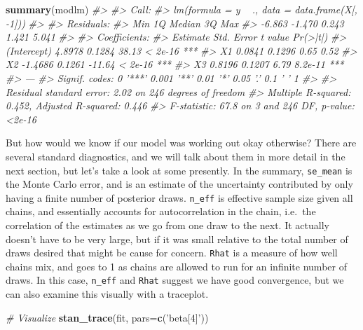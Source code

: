 \documentclass[]{book}
\newenvironment{Shaded}{\begin{snugshade}}{\end{snugshade}}
\newcommand{\CommentTok}[1]{\textcolor[rgb]{0.56,0.35,0.01}{\textit{#1}}}
\newcommand{\DataTypeTok}[1]{\textcolor[rgb]{0.13,0.29,0.53}{#1}}
\newcommand{\KeywordTok}[1]{\textcolor[rgb]{0.13,0.29,0.53}{\textbf{#1}}}
\newcommand{\NormalTok}[1]{#1}
\newcommand{\StringTok}[1]{\textcolor[rgb]{0.31,0.60,0.02}{#1}}
\begin{document}
\begin{Shaded}
\begin{Highlighting}[]
\KeywordTok{summary}\NormalTok{(modlm)}
\CommentTok{#> }
\CommentTok{#> Call:}
\CommentTok{#> lm(formula = y ~ ., data = data.frame(X[, -1]))}
\CommentTok{#> }
\CommentTok{#> Residuals:}
\CommentTok{#>    Min     1Q Median     3Q    Max }
\CommentTok{#> -6.863 -1.470  0.243  1.421  5.041 }
\CommentTok{#> }
\CommentTok{#> Coefficients:}
\CommentTok{#>             Estimate Std. Error t value Pr(>|t|)    }
\CommentTok{#> (Intercept)   4.8978     0.1284   38.13  < 2e-16 ***}
\CommentTok{#> X1            0.0841     0.1296    0.65     0.52    }
\CommentTok{#> X2           -1.4686     0.1261  -11.64  < 2e-16 ***}
\CommentTok{#> X3            0.8196     0.1207    6.79  8.2e-11 ***}
\CommentTok{#> ---}
\CommentTok{#> Signif. codes:  0 '***' 0.001 '**' 0.01 '*' 0.05 '.' 0.1 ' ' 1}
\CommentTok{#> }
\CommentTok{#> Residual standard error: 2.02 on 246 degrees of freedom}
\CommentTok{#> Multiple R-squared:  0.452,  Adjusted R-squared:  0.446 }
\CommentTok{#> F-statistic: 67.8 on 3 and 246 DF,  p-value: <2e-16}
\end{Highlighting}
\end{Shaded}

But how would we know if our model was working out okay otherwise? There are several standard diagnostics, and we will talk about them in more detail in the next section, but let's take a look at some presently. In the summary, \texttt{se\_mean} is the Monte Carlo error, and is an estimate of the uncertainty contributed by only having a finite number of posterior draws. \texttt{n\_eff} is effective sample size given all chains, and essentially accounts for autocorrelation in the chain, i.e.~the correlation of the estimates as we go from one draw to the next. It actually doesn't have to be very large, but if it was small relative to the total number of draws desired that might be cause for concern. \texttt{Rhat} is a measure of how well chains mix, and goes to 1 as chains are allowed to run for an infinite number of draws. In this case, \texttt{n\_eff} and \texttt{Rhat} suggest we have good convergence, but we can also examine this visually with a traceplot.

\begin{Shaded}
\begin{Highlighting}[]
\CommentTok{# Visualize}
\KeywordTok{stan_trace}\NormalTok{(fit, }\DataTypeTok{pars=}\KeywordTok{c}\NormalTok{(}\StringTok{'beta[4]'}\NormalTok{))}
\end{Highlighting}
\end{Shaded}
\end{document}
